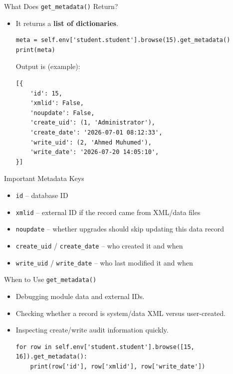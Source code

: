\begin{frame}[fragile]{What Does \texttt{get\_metadata()} Return?}
	\begin{block}{}
		\begin{itemize}
			\item It returns a \textbf{list of dictionaries}.
\begin{lstlisting}
meta = self.env['student.student'].browse(15).get_metadata()
print(meta)
\end{lstlisting}
			Output is (example):
\begin{lstlisting}
[{
	'id': 15,
	'xmlid': False,
	'noupdate': False,
	'create_uid': (1, 'Administrator'),
	'create_date': '2026-07-01 08:12:33',
	'write_uid': (2, 'Ahmed Muhumed'),
	'write_date': '2026-07-20 14:05:10',
}]
\end{lstlisting}
		\end{itemize}
	\end{block}
\end{frame}

\begin{frame}[fragile]{Important Metadata Keys}
	\begin{itemize}
		\item \texttt{id} -- database ID
		\item \texttt{xmlid} -- external ID if the record came from XML/data files
		\item \texttt{noupdate} -- whether upgrades should skip updating this data record
		\item \texttt{create\_uid} / \texttt{create\_date} -- who created it and when
		\item \texttt{write\_uid} / \texttt{write\_date} -- who last modified it and when
	\end{itemize}
\end{frame}

\begin{frame}[fragile]{When to Use \texttt{get\_metadata()}}
	\begin{itemize}
		\item Debugging module data and external IDs.
		\item Checking whether a record is system/data XML versus user-created.
		\item Inspecting create/write audit information quickly.
\begin{lstlisting}
for row in self.env['student.student'].browse([15, 16]).get_metadata():
	print(row['id'], row['xmlid'], row['write_date'])
\end{lstlisting}
	\end{itemize}
\end{frame}

